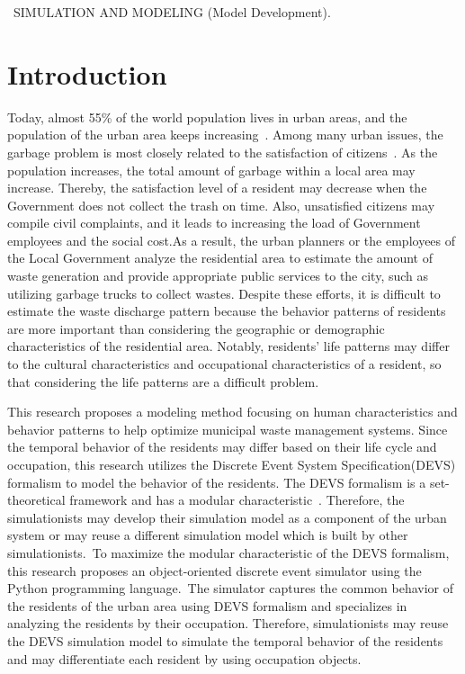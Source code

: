 \documentclass{scsSimAUDPaperFormat}
\begin{document}

 \
SIMULATION AND MODELING (Model Development).\\

\section{Introduction}
Today, almost 55\% of the world population lives in urban areas, and the population of the urban area keeps increasing~\cite{united20182018}. Among many urban issues, the garbage problem is most closely related to the satisfaction of citizens~\cite{mohit2010assessment}. As the population increases, the total amount of garbage within a local area may increase. Thereby, the satisfaction level of a resident may decrease when the Government does not collect the trash on time.  Also, unsatisfied citizens may compile civil complaints, and it leads to increasing the load of Government employees and the social cost.As a result, the urban planners or the employees of the Local Government analyze the residential area to estimate the amount of waste generation and provide appropriate public services to the city, such as utilizing garbage trucks to collect wastes. Despite these efforts, it is difficult to estimate the waste discharge pattern because the behavior patterns of residents are more important than considering the geographic or demographic characteristics of the residential area. Notably, residents' life patterns may differ to the cultural characteristics and occupational characteristics of a resident, so that considering the life patterns are a difficult problem. 

This research proposes a modeling method focusing on human characteristics and behavior patterns to help optimize municipal waste management systems. Since the temporal behavior of the residents may differ based on their life cycle and occupation, this research utilizes the Discrete Event System Specification(DEVS) formalism to model the behavior of the residents. The DEVS formalism is a set-theoretical framework and has a modular characteristic~\cite{Zeigler84, Zeigler90, tms2000}. Therefore, the simulationists may develop their simulation model as a component of the urban system or may reuse a different simulation model which is built by other simulationists.~To maximize the modular characteristic of the DEVS formalism, this research proposes an object-oriented discrete event simulator using the Python programming language.~The simulator captures the common behavior of the residents of the urban area using DEVS formalism and specializes in analyzing the residents by their occupation. Therefore, simulationists may reuse the DEVS simulation model to simulate the temporal behavior of the residents and may differentiate each resident by using occupation objects.
\end{document}
